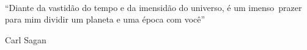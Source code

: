 \
\vfill

\begin{flushright}
\hfill \textit
\bigskip


\bigskip


\bigskip


\bigskip


\bigskip


\bigskip


\bigskip


\bigskip


\bigskip


\bigskip


\bigskip


\bigskip


\bigskip


\bigskip


\bigskip


\bigskip


\bigskip


\bigskip


\bigskip


\bigskip


\bigskip


\bigskip


\bigskip


\bigskip

{\raggedleft
{}``Diante da vastid\~ao do tempo e da imensid\~ao do universo, \'e um imenso\ prazer para mim dividir um planeta e uma
\'epoca com voc\^e''
\par}

{\raggedleft
Carl Sagan
\par}


\bigskip


\bigskip
\end{flushright}

\vspace*{1cm}

\clearpage